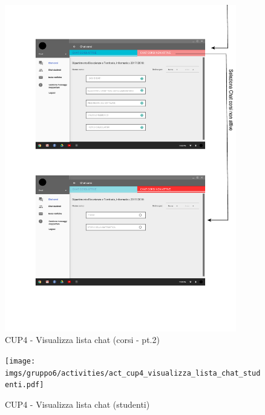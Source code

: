 \begin{figure}
	\centering
	\includegraphics[width=0.9\textwidth]{imgs/gruppo6/activities/act_cup4_visualizza_lista_chat_corsi2.pdf}
	\caption{CUP4 - Visualizza lista chat (corsi - pt.2)}
	\label{fig:cup4-2}
\end{figure}

\begin{figure}
	\centering
	\texttt{[image: imgs/gruppo6/activities/act\_cup4\_visualizza\_lista\_chat\_studenti.pdf]}
	\caption{CUP4 - Visualizza lista chat (studenti)}
	\label{fig:cup4-3}
\end{figure}

